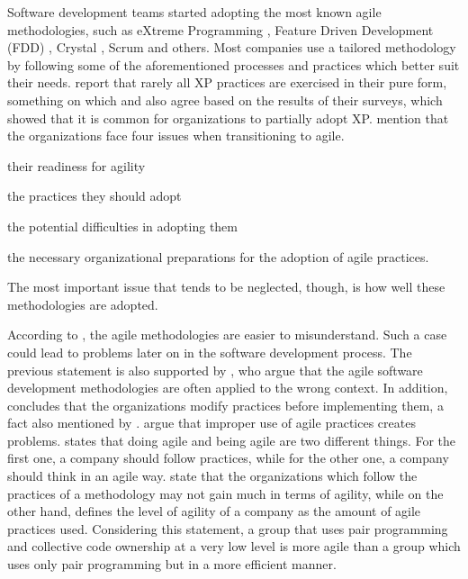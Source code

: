 Software development teams started adopting the most known agile methodologies, such as eXtreme Programming \cite{Beck:2004:EPE:1076267}, Feature Driven Development (FDD) \cite{Palmer:2001:PGF:600044}, Crystal \cite{Cockburn:2004:CCH:1406822}, Scrum \cite{scrum} and others. Most companies use a tailored methodology by following some of the aforementioned processes and practices which better suit their needs. \citet{williams2004toward} report that rarely all XP practices are exercised in their pure form, something on which \citet{Reifer} and \citet{aveling} also agree based on the results of their surveys, which showed that it is common for organizations to partially adopt XP. \citet{sidky} mention that the organizations face four issues when transitioning to agile.
\begin{inparaenum} [a\upshape)]
\item their readiness for agility
\item the practices they should adopt
\item the potential difficulties in adopting them
\item the necessary organizational preparations for the adoption of agile practices. 
\end{inparaenum}
The most important issue that tends to be neglected, though, is how well these methodologies are adopted.

According to \citet{6427226}, the agile methodologies are easier to misunderstand. Such a case could lead to problems later on in the software development process. The previous statement is also supported by \citet{cefam}, who argue that the agile software development methodologies are often applied to the wrong context. In addition, \citet{1629340} concludes that the organizations modify practices before implementing them, a fact also mentioned by \citet{1579312}. \citet{hossain} argue that improper use of agile practices creates problems. \citet{sahota} states that doing agile and being agile are two different things. For the first one, a company should follow practices, while for the other one, a company should think in an agile way. \citet{lappoA04} state that the organizations which follow the practices of a methodology may not gain much in terms of agility, while on the other hand, \citet{sidky_dissertation} defines the level of agility of a company as the amount of agile practices used. Considering this statement, a group that uses pair programming and collective code ownership at a very low level is more agile than a group which uses only pair programming but in a more efficient manner.

